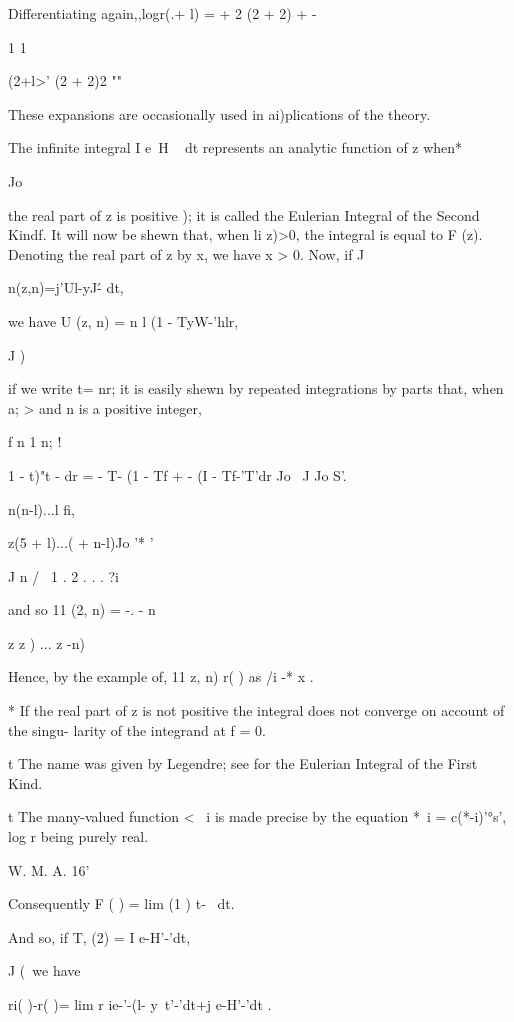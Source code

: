 Differentiating again,,logr(.+ l) = + 2 (2 + 2) + -

1 1

 (2+l>' (2 + 2)2 ""

These expansions are occasionally used in ai)plications of the theory.

The infinite integral I e~H ~ dt represents an analytic function of z
when*

Jo

the real part of z is positive ); it is called the Eulerian
Integral of the Second Kindf. It will now be shewn that, when li z)>0,
the integral is equal to F (z). Denoting the real part of z by x, we
have x > 0. Now, if J

n(z,n)=j'Ul-yJ\'- dt,

we have U (z, n) = n l (1 - TyW-'hlr,

J )

if we write t= nr; it is easily shewn by repeated integrations by
parts that, when a; > and n is a positive integer,

f n 1 n; !

 1 - t)"t - dr = - T- (1 - Tf + - (I - Tf-'T'dr Jo \ J Jo S'.

n(n-l)...l fi,

z(5 + l)...( + n-l)Jo '* '

J n / \ 1 . 2 . . . ?i

and so 11 (2, n) = -. - n

z z ) ... z -n)

Hence, by the example of, 11 z, n) r( ) as /i -* x .

* If the real part of z is not positive the integral does not converge
on account of the singu- larity of the integrand at f = 0.

t The name was given by Legendre; see for the Eulerian
Integral of the First Kind.

t The many-valued function < ~i is made precise by the equation *~i =
c(*-i)'°s', log r being purely real.

W. M. A. 16'

%
%

Consequently F ( ) = lim (1 ) t-~ dt.

And so, if T, (2) = I e-H'-'dt,

J (\ we have

ri( )-r( )= lim r ie-'-(l- y\ t'-'dt+j e-H'-'dt .

